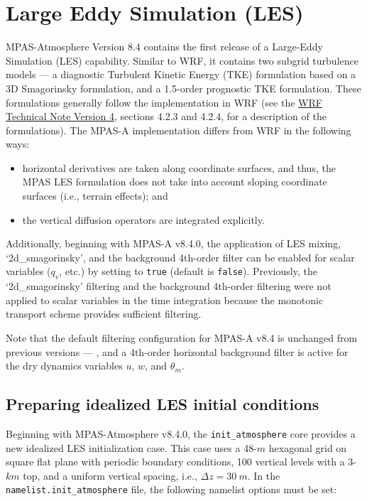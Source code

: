 \section{Large Eddy Simulation (LES)}
\label{sec:LES}

MPAS-Atmosphere Version 8.4 contains the first release of a Large-Eddy Simulation (LES) capability. Similar to WRF, it contains two subgrid turbulence models --- a diagnostic Turbulent Kinetic Energy (TKE) formulation based on a 3D Smagorinsky formulation, and a 1.5-order prognostic TKE formulation. These formulations generally follow the implementation in WRF (see the \href{https://www2.mmm.ucar.edu/wrf/users/docs/technote/v4_technote.pdf}{WRF Technical Note Version 4}, sections 4.2.3 and 4.2.4, for a description of the formulations).  The MPAS-A implementation differs from WRF in the following ways:

\begin{itemize}
\item horizontal derivatives are taken along coordinate surfaces, and thus, the MPAS LES formulation does not take into account sloping coordinate surfaces (i.e., terrain effects); and
\item the vertical diffusion operators are integrated explicitly.
\end{itemize}

Additionally, beginning with MPAS-A v8.4.0, the application of LES mixing, `2d\_smagorinsky', and the background 4th-order filter can be enabled for scalar variables ($q_v$, etc.) by setting  to {\tt true} (default is {\tt false}). Previously, the `2d\_smagorinsky' filtering and the background 4th-order filtering were not applied to scalar variables in the time integration because the monotonic transport scheme provides sufficient filtering.

Note that the default filtering configuration for MPAS-A v8.4 is unchanged from previous versions ---
, and a 4th-order horizontal background filter is active for the dry dynamics variables $u$, $w$, and $\theta_m$.

\subsection{Preparing idealized LES initial conditions}
\label{sec:les_ics}

Beginning with MPAS-Atmosphere v8.4.0, the {\tt init\_atmosphere} core provides a new idealized LES initialization case. This case uses a 48-$m$ hexagonal grid on square flat plane with periodic boundary conditions, 100 vertical levels with a 3-$km$ top, and a uniform vertical spacing, i.e., $\Delta z = 30~m$. In the {\tt namelist.init\_atmosphere} file, the following namelist options must be set:

